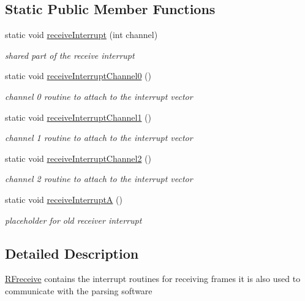\subsection*{Static Public Member Functions}
\begin{DoxyCompactItemize}
\item 
static void \mbox{\hyperlink{class_r_freceive_accecae78a1b37c6374ef287f2169aa65}{receive\+Interrupt}} (int channel)
\begin{DoxyCompactList}\small\item\em shared part of the receive interrupt \end{DoxyCompactList}\item 
static void \mbox{\hyperlink{class_r_freceive_a1f1c4ecbbafe17d4bebe3faedd9a6450}{receive\+Interrupt\+Channel0}} ()
\begin{DoxyCompactList}\small\item\em channel 0 routine to attach to the interrupt vector \end{DoxyCompactList}\item 
static void \mbox{\hyperlink{class_r_freceive_aeb586b7bb9cb2c30ea4fa2b70e4e4a61}{receive\+Interrupt\+Channel1}} ()
\begin{DoxyCompactList}\small\item\em channel 1 routine to attach to the interrupt vector \end{DoxyCompactList}\item 
static void \mbox{\hyperlink{class_r_freceive_a630b264c2715e88e950671b5e60fb283}{receive\+Interrupt\+Channel2}} ()
\begin{DoxyCompactList}\small\item\em channel 2 routine to attach to the interrupt vector \end{DoxyCompactList}\item 
\mbox{\label{class_r_freceive_a6d80c25ebc975f71a4c9ec52b81df778}} 
static void \mbox{\hyperlink{class_r_freceive_a6d80c25ebc975f71a4c9ec52b81df778}{receive\+InterruptA}} ()
\begin{DoxyCompactList}\small\item\em placeholder for old receiver interrupt \end{DoxyCompactList}\end{DoxyCompactItemize}


\subsection{Detailed Description}
\mbox{\hyperlink{class_r_freceive}{R\+Freceive}} contains the interrupt routines for receiving frames it is also used to communicate with the parsing software 

